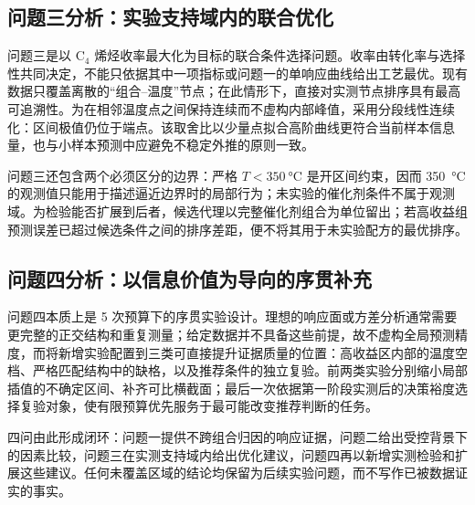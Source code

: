 \subsection{问题三分析：实验支持域内的联合优化}

问题三是以 $\mathrm{C}_4$ 烯烃收率最大化为目标的联合条件选择问题。收率由转化率与选择性共同决定，不能只依据其中一项指标或问题一的单响应曲线给出工艺最优。现有数据只覆盖离散的“组合--温度”节点；在此情形下，直接对实测节点排序具有最高可追溯性。为在相邻温度点之间保持连续而不虚构内部峰值，采用分段线性连续化：区间极值仍位于端点。该取舍比以少量点拟合高阶曲线更符合当前样本信息量，也与小样本预测中应避免不稳定外推的原则一致\cite{hastie2009}。

问题三还包含两个必须区分的边界：严格 $T<\SI{350}{\degreeCelsius}$ 是开区间约束，因而 \SI{350}{\degreeCelsius} 的观测值只能用于描述逼近边界时的局部行为；未实验的催化剂条件不属于观测域。为检验能否扩展到后者，候选代理以完整催化剂组合为单位留出；若高收益组预测误差已超过候选条件之间的排序差距，便不将其用于未实验配方的最优排序。

\subsection{问题四分析：以信息价值为导向的序贯补充}

问题四本质上是 5 次预算下的序贯实验设计。理想的响应面或方差分析通常需要更完整的正交结构和重复测量；给定数据并不具备这些前提，故不虚构全局预测精度，而将新增实验配置到三类可直接提升证据质量的位置：高收益区内部的温度空档、严格匹配结构中的缺格，以及推荐条件的独立复验。前两类实验分别缩小局部插值的不确定区间、补齐可比横截面；最后一次依据第一阶段实测后的决策裕度选择复验对象，使有限预算优先服务于最可能改变推荐判断的任务。

四问由此形成闭环：问题一提供不跨组合归因的响应证据，问题二给出受控背景下的因素比较，问题三在实测支持域内给出优化建议，问题四再以新增实测检验和扩展这些建议。任何未覆盖区域的结论均保留为后续实验问题，而不写作已被数据证实的事实。
